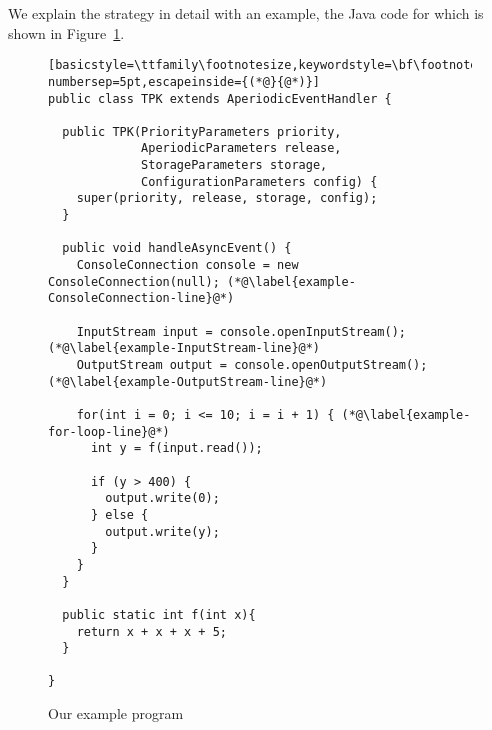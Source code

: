 We explain the strategy in detail with an example, the Java code for
which is shown in Figure~\ref{example-code-figure}.
\begin{figure}[t!]
  \begin{center}
  \begin{minipage}{12cm}
  \begin{lstlisting}[basicstyle=\ttfamily\footnotesize,keywordstyle=\bf\footnotesize,language=Java,numbers=left,numberstyle=\tiny,stepnumber=1, numbersep=5pt,escapeinside={(*@}{@*)}]
public class TPK extends AperiodicEventHandler {

  public TPK(PriorityParameters priority,
             AperiodicParameters release,
             StorageParameters storage,
             ConfigurationParameters config) {
    super(priority, release, storage, config);
  }
      
  public void handleAsyncEvent() {
    ConsoleConnection console = new ConsoleConnection(null); (*@\label{example-ConsoleConnection-line}@*)
        
    InputStream input = console.openInputStream(); (*@\label{example-InputStream-line}@*)
    OutputStream output = console.openOutputStream(); (*@\label{example-OutputStream-line}@*)
        
    for(int i = 0; i <= 10; i = i + 1) { (*@\label{example-for-loop-line}@*)
      int y = f(input.read());
          
      if (y > 400) {
        output.write(0);
      } else {
        output.write(y);
      }
    }
  }
      
  public static int f(int x){
    return x + x + x + 5;
  }
      
}
\end{lstlisting}
\end{minipage}
\end{center}
  \caption{Our example program}
  \label{example-code-figure}
\end{figure}
